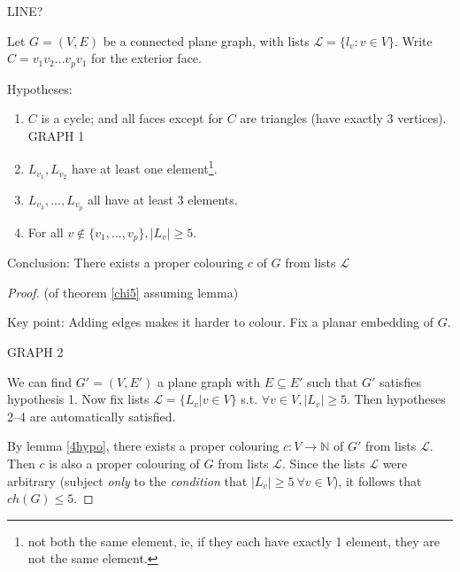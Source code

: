 \documentclass{article}
\begin{document}
LINE?

\begin{lem}
\label{4hypo}
Let $G=(V,E)$ be a connected plane graph, with lists $\mathcal{L}=\{l_v: v \in V\}$.  Write $C=v_1v_2 \ldots v_p v_1$ for the exterior face.

Hypotheses:
\begin{enumerate}
 \item $C$ is a cycle; and all faces except for $C$ are triangles (have exactly 3 vertices).
GRAPH 1
\item $L_{v_1},L_{v_2}$ have at least one element\footnote{not both the same element, ie, if they each have exactly 1 element, they are not the same element.}.
\item $L_{v_3},\ldots, L_{v_p}$ all have at least 3 elements.
\item For all $v \notin \{v_1, \ldots, v_p\}, |L_v| \geq 5$.
\end{enumerate}

Conclusion: There exists a proper colouring $c$ of $G$ from lists $\mathcal{L}$
\end{lem}

\begin{proof}(of theorem \ref{chi5}  assuming lemma)

Key point: Adding edges makes it harder to colour.  Fix a planar embedding of $G$.

GRAPH 2

We can find $G'=(V,E')$ a plane graph with $E \subseteq E'$ such that $G'$ satisfies hypothesis 1.  Now fix lists $\mathcal{L}=\{L_v | v \in V \}$ s.t. $\forall v \in V, |L_v| \geq 5$.  Then hypotheses 2--4 are automatically satisfied.

By lemma \ref{4hypo}, there exists a proper colouring $c: V \rightarrow \mathbb{N}$ of $G'$ from lists $\mathcal{L}$.  Then $c$ is also a proper colouring of $G$ from lists $\mathcal{L}$.  Since the lists $\mathcal{L}$ were arbitrary (subject \emph{only} to the \emph{condition} that $|L_v| \geq 5 ~ \forall v \in V$), it follows that $ch(G) \leq 5$.
\end{proof}
\end{document}
